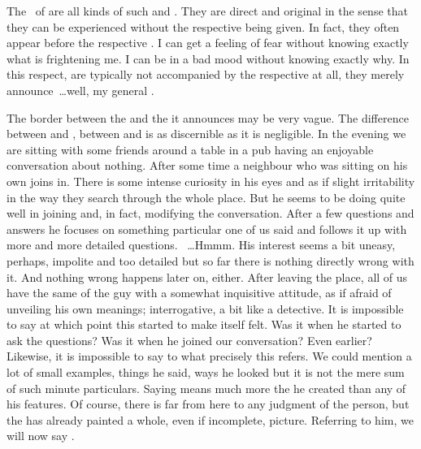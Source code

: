 \pa
The \oss\ of  are all kinds of such  and
. They are direct and original
in the sense that they can be experienced without the respective 
being  given.  In fact, they often appear before the respective
.  I can get a feeling of fear without knowing exactly what is
frightening me.  I can be in a bad mood without knowing exactly why.  In this
respect,  are typically not accompanied by the respective
 at all, they merely announce~\ldots well, my general .

The border between the  and the  it announces may be
very vague. The difference between  and , between  and
 is as discernible as it is negligible. 
%
In the evening we are sitting with some friends around a table in a pub having
an enjoyable conversation about nothing. After some time a neighbour who was
sitting on his own joins in. There is some intense curiosity in his eyes and as
if slight irritability in the way they search through the whole place. But he
seems to be doing quite well in joining and, in fact, modifying the
conversation. After a few questions and answers he focuses on something
particular one of us said and follows it up with more and more detailed
questions. ~\ldots Hmmm.  His interest seems
a bit uneasy, perhaps, impolite and too detailed but so far there is nothing
directly wrong with it. And nothing wrong happens later on, either. After
leaving the place, all of us have the same  of the guy with a
somewhat inquisitive attitude, as if afraid of unveiling his own meanings;
interrogative, a bit like a detective.  It is impossible to say at which point
this  started to make itself felt. Was it when he started to ask
the questions? Was it when he joined our conversation? Even earlier?  Likewise,
it is impossible to say to what precisely this  refers. We could
mention a lot of small examples, things he said, ways he looked but it is not
the mere sum of such minute particulars. Saying  means much
more the  he created than any of his 
features.  Of course, there is far from here to any judgment of the person, but
the  has already painted a whole, even if incomplete, picture.
Referring to him, we will now say .

